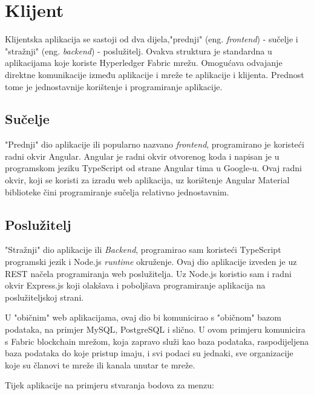 \documentclass[times, utf8, diplomski]{fer}
\begin{document}
\section{Klijent}

Klijentska aplikacija se sastoji od dva dijela,"prednji" (eng. \textit{frontend}) - sučelje i "stražnji" (eng. \textit{backend}) - poslužitelj. Ovakva struktura je standardna u aplikacijama koje koriste Hyperledger Fabric mrežu.  Omogućava odvajanje direktne komunikacije između aplikacije i mreže te aplikacije i klijenta. Prednost tome je jednostavnije korištenje i programiranje aplikacije. 
\subsection{Sučelje}

"Prednji" dio aplikacije ili popularno nazvano \textit{frontend},  programirano je koristeći radni okvir Angular.  Angular je radni okvir otvorenog koda i napisan je u programskom jeziku TypeScript od strane Angular tima u Google-u. Ovaj radni okvir,  koji se koristi za izradu web aplikacija, uz korištenje Angular Material biblioteke čini programiranje sučelja relativno jednostavnim. 

\subsection{Poslužitelj}

"Stražnji" dio aplikacije ili \textit{Backend}, programirao sam koristeći TypeScript programski jezik i Node.js \textit{runtime} okruženje.  Ovaj dio aplikacije izveden je uz REST načela \cite{BATTLE200861} programiranja web poslužitelja. Uz Node.js koristio sam i radni okvir Express.js koji olakšava i poboljšava programiranje aplikacija na poslužiteljskoj strani.%

U "običnim" web aplikacijama, ovaj dio bi komunicirao s "običnom" bazom podataka, na primjer MySQL, PostgreSQL i slično. U ovom primjeru komunicira s Fabric blockchain mrežom, koja zapravo služi kao baza podataka, raspodijeljena baza podataka do koje pristup imaju, i svi podaci su jednaki, sve organizacije koje su članovi te mreže ili kanala unutar te mreže. 

Tijek aplikacije na primjeru stvaranja bodova za menzu:
\end{document}
